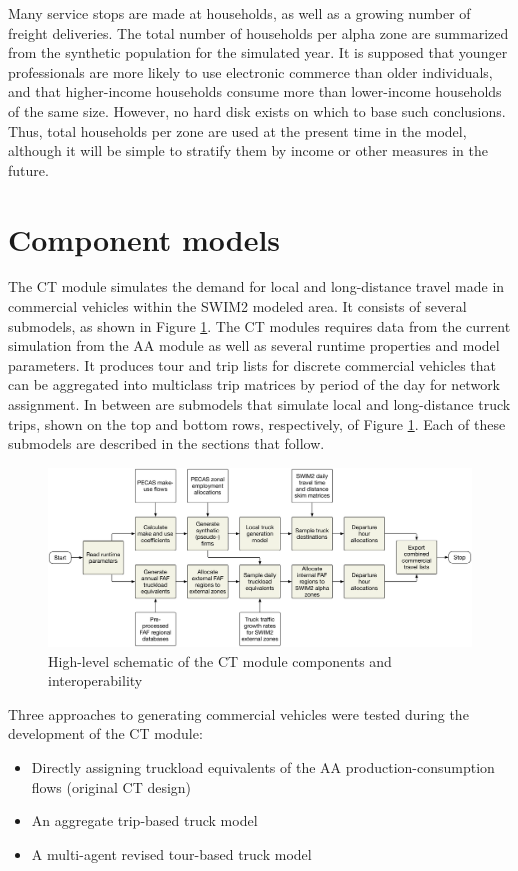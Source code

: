 Many service stops are made at households, as well as a growing number of freight deliveries. The total number of households per alpha zone are summarized from the synthetic population for the simulated year. It is supposed that younger professionals are more likely to use electronic commerce than older individuals, and that higher-income households consume more than lower-income households of the same size. However, no hard disk exists on which to base such conclusions. Thus, total households per zone are used at the present time in the model, although it will be simple to stratify them by income or other measures in the future.

\section{Component models}

The CT module simulates the demand for local and long-distance travel made in commercial vehicles within the SWIM2 modeled area. It consists of several submodels, as shown in Figure \ref{fig:ct-high-level}. The CT modules requires data from the current simulation from the AA module as well as several runtime properties and model parameters. It produces tour and trip lists for discrete commercial vehicles that can be aggregated into multiclass trip matrices by period of the day for network assignment. In between are submodels that simulate local and long-distance truck trips, shown on the top and bottom rows, respectively, of Figure \ref{fig:ct-high-level}. Each of these submodels are described in the sections that follow.

\begin{figure}
\centering
\includegraphics[width=6.25in, trim=0mm 10mm 0mm 0mm]{figures/ct-high-level}
\caption{High-level schematic of the CT module components and interoperability}
\label{fig:ct-high-level}
\end{figure}

Three approaches to generating commercial vehicles were tested during the development of the CT module:
\begin{itemize}
    \item Directly assigning truckload equivalents of the AA production-consumption flows (original CT design)
    \item An aggregate trip-based truck model
    \item A multi-agent revised tour-based truck model
\end{itemize}

